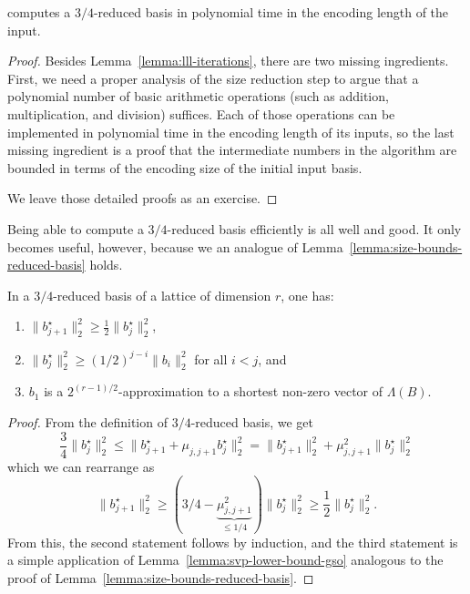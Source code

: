 \begin{theorem}
   computes a $3/4$-reduced basis in polynomial time
  in the encoding length of the input.
\end{theorem}
\begin{proof}
  Besides Lemma~\ref{lemma:lll-iterations},
  there are two missing ingredients.
  First, we need a proper analysis of the size reduction step to argue
  that a polynomial number of basic arithmetic operations (such as addition, multiplication, and division) suffices.
  Each of those operations can be implemented in polynomial time in the encoding length of its inputs,
  so the last missing ingredient is a proof that the intermediate numbers in the algorithm
  are bounded in terms of the encoding size of the initial input basis.
  
  We leave those detailed proofs as an exercise.
\end{proof}

Being able to compute a $3/4$-reduced basis efficiently is all well and good.
It only becomes useful, however, because we an analogue of Lemma~\ref{lemma:size-bounds-reduced-basis} holds.

\begin{lemma}
  \label{lemma:lll-reduced-properties}
  In a $3/4$-reduced basis of a lattice of dimension $r$, one has:
  \begin{enumerate}
    \item $\| b_{j+1}^\star \|_2^2 \geq \frac{1}{2} \|b_j^\star\|_2^2$,
    \item $\| b_j^\star \|_2^2 \geq (1/2)^{j-i} \|b_i\|_2^2$ for all $i < j$, and
    \item $b_1$ is a $2^{(r-1)/2}$-approximation to a shortest non-zero vector of $\Lambda(B)$.
  \end{enumerate}
\end{lemma}
\begin{proof}
  From the definition of $3/4$-reduced basis, we get
  \[
    \frac{3}{4} \|b_j^\star \|_2^2 \leq \| b_{j+1}^\star + \mu_{j,j+1} b_j^\star \|_2^2
      = \| b_{j+1}^\star \|_2^2 + \mu_{j,j+1}^2 \|b_j^\star\|_2^2
  \]
  which we can rearrange as
  \[
    \| b_{j+1}^\star \|_2^2 \geq (3/4 - \underbrace{\mu_{j,j+1}^2}_{\leq 1/4}) \|b_j^\star\|_2^2 \geq \frac{1}{2} \|b_j^\star\|_2^2.
  \]
  From this, the second statement follows by induction,
  and the third statement is a simple application of
  Lemma~\ref{lemma:svp-lower-bound-gso} analogous to the proof of Lemma~\ref{lemma:size-bounds-reduced-basis}.
\end{proof}







